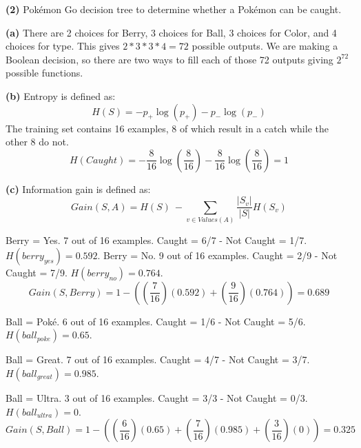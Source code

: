 \documentclass[11pt]{article}
\renewcommand\part[1]{\vspace{.10in}\textbf{(#1)}}
\begin{document}
\part{2} Pok\'{e}mon Go decision tree to determine whether a Pok\'{e}mon can be caught.

\part{a} There are 2 choices for Berry, 3 choices for Ball, 3 choices for Color, and 4 choices for type. This gives $2 * 3 * 3 * 4 = 72$ possible outputs. We are making a Boolean decision, so there are two ways to fill each of those 72 outputs giving $2^{72}$ possible functions.

 \par

\part{b} Entropy is defined as: $$H(S) = -p_+\log(p_+) - p_-\log(p_-)$$
The training set contains 16 examples, 8 of which result in a catch while the other 8 do not. 
$$H(Caught) = -\frac{8}{16}\log(\frac{8}{16})-\frac{8}{16}\log(\frac{8}{16}) = 1$$

 \par
	
\part{c} Information gain is defined as:
$$Gain(S, A) = H(S)\  - \sum_{v\in Values(A)} \frac{|S_v|}{|S|} H(S_v)$$

Berry = Yes. 7 out of 16 examples. Caught = 6/7 - Not Caught = 1/7. $H(berry_{yes}) = 0.592$.
Berry = No. 9 out of 16 examples. Caught = 2/9 - Not Caught = 7/9. $H(berry_{no}) = 0.764$.
$$Gain(S, Berry) = 1 - ((\frac{7}{16})(0.592) + (\frac{9}{16})(0.764)) = 0.689$$

 \par
\newpage

Ball = Pok\'{e}. 6 out of 16 examples. Caught = 1/6 - Not Caught = 5/6. $H(ball_{poke}) = 0.65$.

Ball = Great. 7 out of 16 examples. Caught = 4/7 - Not Caught = 3/7. $H(ball_{great}) = 0.985$.

Ball = Ultra. 3 out of 16 examples. Caught = 3/3 - Not Caught = 0/3. $H(ball_{ultra}) = 0$.
$$Gain(S, Ball) = 1 - ((\frac{6}{16})(0.65) + (\frac{7}{16})(0.985) + (\frac{3}{16})(0)) = 0.325$$
\end{document}
